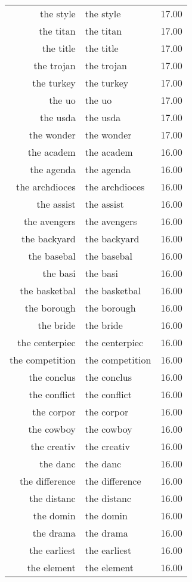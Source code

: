 \begin{table}[ht]
\begin{tabular}{rlr}
  the style & the style & 17.00 \\ 
  the titan & the titan & 17.00 \\ 
  the title & the title & 17.00 \\ 
  the trojan & the trojan & 17.00 \\ 
  the turkey & the turkey & 17.00 \\ 
  the uo & the uo & 17.00 \\ 
  the usda & the usda & 17.00 \\ 
  the wonder & the wonder & 17.00 \\ 
  the academ & the academ & 16.00 \\ 
  the agenda & the agenda & 16.00 \\ 
  the archdioces & the archdioces & 16.00 \\ 
  the assist & the assist & 16.00 \\ 
  the avengers & the avengers & 16.00 \\ 
  the backyard & the backyard & 16.00 \\ 
  the basebal & the basebal & 16.00 \\ 
  the basi & the basi & 16.00 \\ 
  the basketbal & the basketbal & 16.00 \\ 
  the borough & the borough & 16.00 \\ 
  the bride & the bride & 16.00 \\ 
  the centerpiec & the centerpiec & 16.00 \\ 
  the competition & the competition & 16.00 \\ 
  the conclus & the conclus & 16.00 \\ 
  the conflict & the conflict & 16.00 \\ 
  the corpor & the corpor & 16.00 \\ 
  the cowboy & the cowboy & 16.00 \\ 
  the creativ & the creativ & 16.00 \\ 
  the danc & the danc & 16.00 \\ 
  the difference & the difference & 16.00 \\ 
  the distanc & the distanc & 16.00 \\ 
  the domin & the domin & 16.00 \\ 
  the drama & the drama & 16.00 \\ 
  the earliest & the earliest & 16.00 \\ 
  the element & the element & 16.00 \\ 

\end{tabular}
\end{table}
